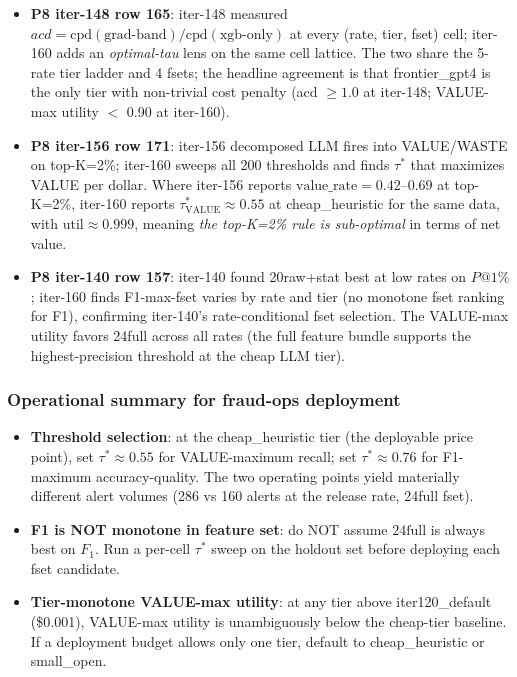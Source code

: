 \documentclass{article}
\begin{document}
\begin{itemize}
\item \textbf{P8 iter-148 row 165}: iter-148 measured
$acd = \mathrm{cpd}(\mathrm{grad\text{-}band})/\mathrm{cpd}(\mathrm{xgb\text{-}only})$
at every (rate, tier, fset) cell; iter-160 adds an \emph{optimal-tau}
lens on the same cell lattice. The two share the 5-rate tier ladder
and 4 fsets; the headline agreement is that frontier\_gpt4 is the only
tier with non-trivial cost penalty (acd $\geq 1.0$ at iter-148; VALUE-max
utility $<$ 0.90 at iter-160).
\item \textbf{P8 iter-156 row 171}: iter-156 decomposed LLM fires into
VALUE/WASTE on top-K=2\%; iter-160 sweeps all 200 thresholds and finds
$\tau^*$ that maximizes VALUE per dollar. Where iter-156 reports
$\mathrm{value\_rate} = 0.42$--$0.69$ at top-K=2\%, iter-160 reports
$\tau^*_{\mathrm{VALUE}} \approx 0.55$ at cheap\_heuristic for the
same data, with $\mathrm{util} \approx 0.999$, meaning \emph{the
top-K=2\% rule is sub-optimal} in terms of net value.
\item \textbf{P8 iter-140 row 157}: iter-140 found 20raw+stat best at
low rates on $P@1\%$; iter-160 finds F1-max-fset varies by rate and
tier (no monotone fset ranking for F1), confirming iter-140's
rate-conditional fset selection. The VALUE-max utility favors 24full
across all rates (the full feature bundle supports the highest-precision
threshold at the cheap LLM tier).
\end{itemize}

\subsubsection{Operational summary for fraud-ops deployment}

\begin{itemize}
\item \textbf{Threshold selection}: at the cheap\_heuristic tier (the
deployable price point), set $\tau^* \approx 0.55$ for VALUE-maximum
recall; set $\tau^* \approx 0.76$ for F1-maximum accuracy-quality.
The two operating points yield materially different alert volumes
(286 vs 160 alerts at the release rate, 24full fset).
\item \textbf{F1 is NOT monotone in feature set}: do NOT assume
$\mathrm{24full}$ is always best on $F_1$. Run a per-cell $\tau^*$
sweep on the holdout set before deploying each fset candidate.
\item \textbf{Tier-monotone VALUE-max utility}: at any tier above
iter120\_default (\$0.001), VALUE-max utility is unambiguously below
the cheap-tier baseline. If a deployment budget allows only one tier,
default to cheap\_heuristic or small\_open.
\end{itemize}
\end{document}
